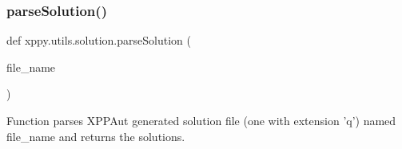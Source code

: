 \subsubsection{\texorpdfstring{parse\+Solution()}{parseSolution()}}
{\footnotesize\ttfamily def xppy.\+utils.\+solution.\+parse\+Solution (\begin{DoxyParamCaption}\item[{}]{file\+\_\+name }\end{DoxyParamCaption})}

\begin{DoxyVerb}Function parses XPPAut generated solution file (one with extension 'q')
named file_name and returns the solutions.
\end{DoxyVerb}
 